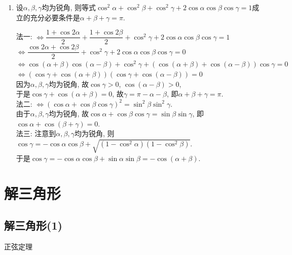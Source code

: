 \begin{enumerate}
\item 设$\alpha,\beta,\gamma$均为锐角, 则等式$\cos^2\alpha+\cos^2\beta+\cos^2\gamma+2\cos\alpha\cos\beta\cos\gamma=1$成立的充分必要条件是$\alpha+\beta+\gamma=\pi$. 
\begin{jieda}
法一: $\iff\dfrac{1+\cos2\alpha}{2}+\dfrac{1+\cos2\beta}{2}+\cos^2\gamma+2\cos\alpha\cos\beta\cos\gamma=1$\\
$\iff\dfrac{\cos2\alpha+\cos2\beta}{2}+\cos^2\gamma+2\cos\alpha\cos\beta\cos\gamma=0$\\
$\iff\cos(\alpha+\beta)\cos(\alpha-\beta)+\cos^2\gamma+(\cos(\alpha+\beta)+\cos(\alpha-\beta))\cos\gamma=0$\\
$\iff(\cos\gamma+\cos(\alpha+\beta))(\cos\gamma+\cos(\alpha-\beta))=0$\\
因为$\alpha,\beta,\gamma$均为锐角, 故$\cos\gamma>0$, $\cos(\alpha-\beta)>0$, \\
于是$\cos\gamma+\cos(\alpha+\beta)=0$, 故$\gamma=\pi-\alpha-\beta$, 即$\alpha+\beta+\gamma=\pi$. \\
法二: $\iff(\cos\alpha+\cos\beta\cos\gamma)^2=\sin^2\beta\sin^2\gamma$. \\
由于$\alpha,\beta,\gamma$均为锐角, 故$\cos\alpha+\cos\beta\cos\gamma=\sin\beta\sin\gamma$, 即$\cos\alpha+\cos(\beta+\gamma)=0$. \\
法三: 注意到$\alpha,\beta,\gamma$均为锐角, 则$\cos\gamma=-\cos\alpha\cos\beta+\sqrt{(1-\cos^2\alpha)(1-\cos^2\beta)}$. \\
于是$\cos\gamma=-\cos\alpha\cos\beta+\sin\alpha\sin\beta=-\cos(\alpha+\beta)$. 
\end{jieda}

\end{enumerate}





\section{解三角形}


\subsection{解三角形(1)}
\zsd 正弦定理


